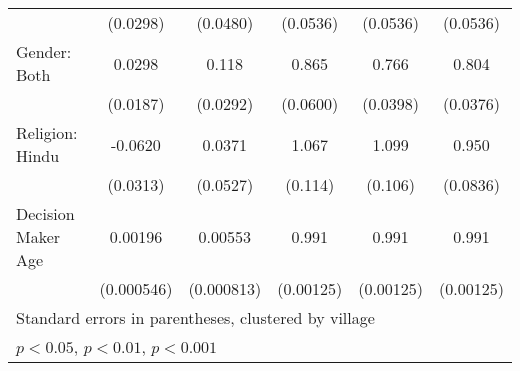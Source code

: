 {\begin{tabular}{l*{5}{c}}
                   &    (0.0298)         &    (0.0480)      &    (0.0536)         &    (0.0536)         &    (0.0536)        \\
[1em]
Gender: Both          &      0.0298         &       0.118\sym{***}  &         0.865\sym{*}  &       0.766\sym{***}&       0.804\sym{***}\\
                    &     (0.0187)         &    (0.0292)         &    (0.0600)         &    (0.0398)         &    (0.0376)       \\
[1em]
Religion: Hindu        &     -0.0620\sym{*}  &      0.0371           &        1.067         &       1.099         &       0.950        \\
                    &    (0.0313)         &    (0.0527)         &    (0.114)         &     (0.106)         &    (0.0836)         \\
[1em]
Decision Maker Age          &     0.00196\sym{***}&     0.00553\sym{***}&       0.991\sym{***}&       0.991\sym{***}&       0.991\sym{***}\\
                    &  (0.000546)         &  (0.000813)         &   (0.00125)         &   (0.00125)         &   (0.00125)         \\
\hline\hline
\multicolumn{6}{l}{\footnotesize Standard errors in parentheses, clustered by village}\\
\multicolumn{6}{l}{\footnotesize \sym{*} \(p<0.05\), \sym{**} \(p<0.01\), \sym{***} \(p<0.001\)}\\
\end{tabular}%
}